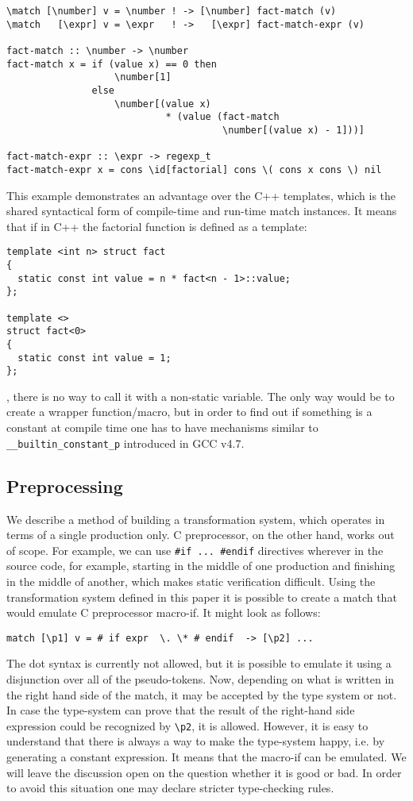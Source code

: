 \begin{verbatim}
\match [\number] v = \number ! -> [\number] fact-match (v)
\match   [\expr] v = \expr   ! ->   [\expr] fact-match-expr (v)

fact-match :: \number -> \number
fact-match x = if (value x) == 0 then
                   \number[1]
               else
                   \number[(value x) 
                            * (value (fact-match 
                                      \number[(value x) - 1]))]

fact-match-expr :: \expr -> regexp_t
fact-match-expr x = cons \id[factorial] cons \( cons x cons \) nil
\end{verbatim}

This example demonstrates an advantage over the C++ templates, which
is the shared syntactical form of compile-time and run-time match instances.
It means that if in C++ the factorial function is defined as a template:
\begin{verbatim}
template <int n> struct fact 
{
  static const int value = n * fact<n - 1>::value;
};
 
template <>
struct fact<0> 
{
  static const int value = 1;
};
\end{verbatim}
, there is no way to call it with a non-static variable.  The only way 
would be to create a wrapper function/macro, but in order to find out
if something is a constant at compile time one has to have mechanisms
similar to \verb|__builtin_constant_p| introduced in GCC v4.7.

\subsection{Preprocessing}
We describe a method of building a transformation system, which operates 
in terms of a
single production only.  C preprocessor, on the other hand, works out of scope.
For example, we can use \verb|#if ... #endif| directives wherever in the
source code, for example, starting in the middle of one production and
finishing in the middle of another, which makes static verification difficult.
Using the transformation system defined in this paper it is possible to 
create a match
that would emulate C preprocessor macro-if.  It might look as follows:
\begin{verbatim}
match [\p1] v = # if expr  \. \* # endif  -> [\p2] ...
\end{verbatim}
The dot syntax is currently not allowed, but it is possible to emulate it using
a disjunction over all of the pseudo-tokens.  Now, depending on what is written
in the right hand side of the match, it may be accepted by the type system or
not.  In case the type-system can prove that the result of the right-hand side
expression could be recognized by \verb|\p2|, it is allowed.  However, it is
easy to understand that there is always a way to make the type-system happy,
i.e. by generating a constant expression.  It means that the macro-if can be
emulated.  We will leave the discussion open on the question whether it is good
or bad.  In order to avoid this situation one may declare stricter
type-checking rules.
